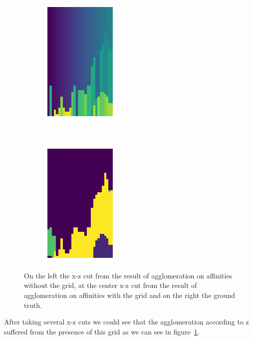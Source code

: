 \begin{figure}[!htbp]
\begin{subfigure}[t]{0.31\textwidth}
        \includegraphics[height=1\textwidth]{./images/bad_agglo.png}
    \end{subfigure}
    ~ 
    \begin{subfigure}[t]{0.31\textwidth}
        \centering
        \includegraphics[height=1\textwidth]{./images/agglo_gt.png}
    \end{subfigure}
	\caption{On the left the x-z cut from the result of agglomeration on affinities without the grid, at the center x-z cut from the result of agglomeration on affinities with the grid and on the right the ground truth.}
	\label{fig:agglomeration}
\end{figure}

After taking several x-z cuts we could see that the agglomeration according to z suffered from the presence of this grid as we can see in figure~\ref{fig:agglomeration}.